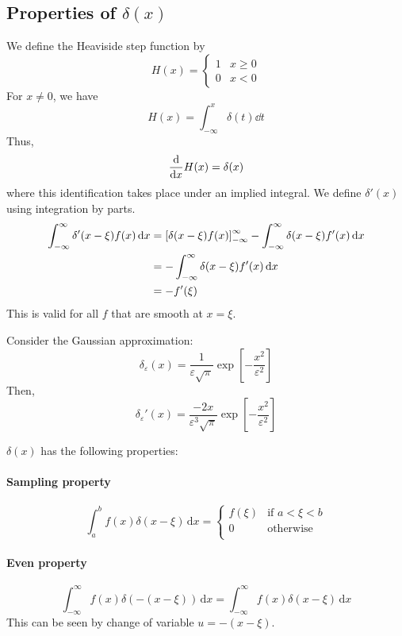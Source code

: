 \documentclass[a4paper]{article}
\begin{document}
\subsection{Properties of $\delta(x)$}
We define the Heaviside step function by
\[
	H(x) = \begin{cases}
		1 & x \geq 0 \\
		0 & x < 0
	\end{cases}
\]
For \( x \neq 0 \), we have
\[
	H(x) = \int_{-\infty}^x \delta(t) \dd{t}
\]
Thus,
\[
	\dv{x} H(x) = \delta(x)
\]
where this identification takes place under an implied integral.
We define \( \delta'(x) \) using integration by parts.
\begin{align*}
	\int_{-\infty}^\infty \delta'(x-\xi) f(x) \,\mathrm{d}{x} & = \qty[\delta(x-\xi) f(x)]_{-\infty}^\infty - \int_{-\infty}^\infty \delta(x-\xi) f'(x) \,\mathrm{d}{x} \\
	                                                 & = - \int_{-\infty}^\infty \delta(x-\xi) f'(x) \,\mathrm{d}{x}                                           \\
	                                                 & = - f'(\xi)
\end{align*}
This is valid for all \( f \) that are smooth at \( x = \xi \).
\begin{example}
	Consider the Gaussian approximation:
	\[
		\delta_\varepsilon(x) = \frac{1}{\varepsilon \sqrt{\pi}} \exp[-\frac{x^2}{\varepsilon^2}]
	\]
	Then,
	\[
		\delta_\varepsilon'(x) = \frac{-2x}{\varepsilon^3 \sqrt{\pi}} \exp[-\frac{x^2}{\varepsilon^2}]
	\]
\end{example}

$ \delta(x) $ has the following properties: 

\paragraph{Sampling property} 
\[
    \int_{a}^{b} f(x) \delta(x - \xi) \,\mathrm{d}x = \begin{cases}
    f(\xi) &\text{if }a<\xi<b\\
    0 &\text{otherwise}\\
    \end{cases} 
\]

\paragraph{Even property}
\[
    \int_{-\infty}^{\infty} f(x) \delta(-(x-\xi)) \,\mathrm{d}x = \int_{-\infty}^{\infty} f(x) \delta(x-\xi) \,\mathrm{d}x
\]
This can be seen by change of variable $u = -(x-\xi)$. 
\end{document}
